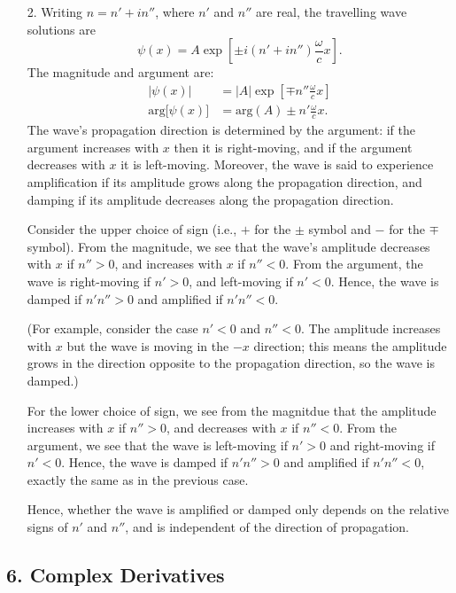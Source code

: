 \documentclass[10pt,a4paper]{article}
\begin{document}
\begin{enumerate}
\item[2.]
Writing $n = n' + i n''$, where $n'$ and $n''$ are real, the
travelling wave solutions are
\begin{equation}
  \psi(x) = A \exp\left[\pm i (n'+in'')\frac{\omega}{c} x\right].
\end{equation}
The magnitude and argument are:
\begin{align}
  \big|\psi(x)\big| &= |A| \exp\left[\mp n'' \frac{\omega}{c} x \right] \\
  \mathrm{arg}\big[\psi(x)\big] &= \mathrm{arg}(A) \pm n' \frac{\omega}{c} x.
\end{align}
The wave's propagation direction is determined by the argument: if the
argument increases with $x$ then it is right-moving, and if the
argument decreases with $x$ it is left-moving. Moreover, the wave is
said to experience amplification if its amplitude grows along the
propagation direction, and damping if its amplitude decreases along the
propagation direction.

Consider the upper choice of sign (i.e., $+$ for the $\pm$ symbol
and $-$ for the $\mp$ symbol). From the magnitude, we see that the
wave's amplitude decreases with $x$ if $n'' > 0$, and increases with
$x$ if $n'' < 0$. From the argument, the wave is right-moving if
$n' >0$, and left-moving if $n' < 0$. Hence, the wave is damped if
$n' n'' >0$ and amplified if $n' n'' < 0$.

(For example, consider the case $n' < 0$ and $n'' < 0$. The
amplitude increases with $x$ but the wave is moving in the $-x$
direction; this means the amplitude grows in the direction opposite to
the propagation direction, so the wave is damped.)

For the lower choice of sign, we see from the magnitdue that the
amplitude increases with $x$ if $n'' > 0$, and decreases with $x$
if $n'' < 0$. From the argument, we see that the wave is left-moving
if $n' >0$ and right-moving if $n' < 0$. Hence, the wave is damped
if $n' n'' >0$ and amplified if $n' n'' < 0$, exactly the same as in
the previous case.

Hence, whether the wave is amplified or damped only depends on the
relative signs of $n'$ and $n''$, and is independent of the
direction of propagation.
\end{enumerate}

\subsection*{6. Complex Derivatives}
\end{document}
